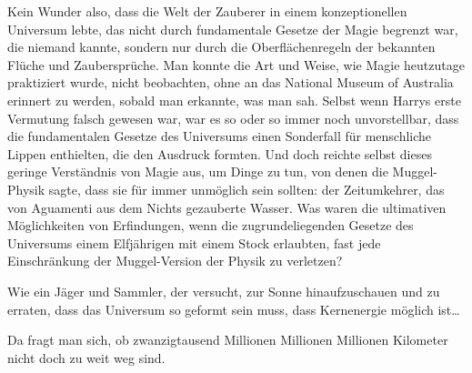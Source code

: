Kein Wunder also, dass die Welt der Zauberer in einem konzeptionellen Universum lebte, das nicht durch fundamentale Gesetze der Magie begrenzt war, die niemand kannte, sondern nur durch die Oberflächenregeln der bekannten Flüche und Zaubersprüche. Man konnte die Art und Weise, wie Magie heutzutage praktiziert wurde, nicht beobachten, ohne an das National Museum of Australia erinnert zu werden, sobald man erkannte, was man sah. Selbst wenn Harrys erste Vermutung falsch gewesen war, war es so oder so immer noch unvorstellbar, dass die fundamentalen Gesetze des Universums einen Sonderfall für menschliche Lippen enthielten, die den Ausdruck  formten. Und doch reichte selbst dieses geringe Verständnis von Magie aus, um Dinge zu tun, von denen die Muggel-Physik sagte, dass sie für immer unmöglich sein sollten: der Zeitumkehrer, das von Aguamenti aus dem Nichts gezauberte Wasser. Was waren die ultimativen Möglichkeiten von Erfindungen, wenn die zugrundeliegenden Gesetze des Universums einem Elfjährigen mit einem Stock erlaubten, fast jede Einschränkung der Muggel-Version der Physik zu verletzen?

Wie ein Jäger und Sammler, der versucht, zur Sonne hinaufzuschauen und zu erraten, dass das Universum so geformt sein muss, dass Kernenergie möglich ist…

Da fragt man sich, ob zwanzigtausend Millionen Millionen Millionen Kilometer nicht doch zu weit weg sind.


